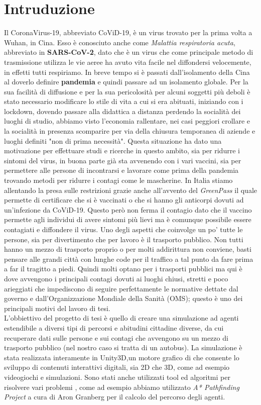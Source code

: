 \documentclass[12pt, openany]{book}
\begin{document}
	\chapter*{Intruduzione}	
		Il CoronaVirus-19, abbreviato CoViD-19, è un virus trovato per la prima volta a Wuhan, in Cina. Esso è conosciuto anche come \emph{Malattia respiratoria acuta}, abbreviato in \textbf{SARS-CoV-2}, dato che è un virus che come principale metodo di trasmissione utilizza le vie aeree ha avuto vita facile nel diffondersi velocemente, in effetti tutti respiriamo. In breve tempo si è passati dall'isolamento della Cina al doverlo definire \textbf{pandemia} e quindi passare ad un isolamento globale.
		Per la sua facilità di diffusione e per la sua pericolosità per alcuni soggetti più deboli è stato necessario modificare lo stile di vita a cui si era abituati, iniziando con i lockdown, dovendo passare alla didattica a distanza perdendo la socialità dei luoghi di studio, abbiamo visto l'economia rallentare, nei casi peggiori crollare e la socialità in presenza scomparire per via della chiusura temporanea di aziende e luoghi definiti "non di prima necessità".
		Questa situazione ha dato una motivazione per effettuare studi e ricerche in questo ambito, sia per ridurre i sintomi del virus, in buona parte già sta avvenendo con i vari vaccini, sia per permettere alle persone di incontrarsi e lavorare come prima della pandemia trovando metodi per ridurre i contagi come le mascherine. In Italia stiamo allentando la presa sulle restrizioni grazie anche all'avvento del \emph{GreenPass} il quale permette di certificare che si è vaccinati o che si hanno gli anticorpi dovuti ad un'infezione da CoViD-19. Questo però non ferma il contagio dato che il vaccino permette agli individui di avere sintomi più lievi ma è comunque possibile essere contagiati e diffondere il virus. 
		Uno degli aspetti che coinvolge un po' tutte le persone, sia per divertimento che per lavoro è il trasporto pubblico. Non tutti hanno un mezzo di trasporto proprio o per molti addirittura non conviene, basti pensare alle grandi città con lunghe code per il traffico a tal punto da fare prima a far il tragitto a piedi. Quindi molti optano per i trasporti pubblici ma qui è dove avvengono i principali contagi dovuti ai luoghi chiusi, stretti e poco arieggiati che impediscono di seguire perfettamente le normative dettate dal governo e dall'Organizzazione Mondiale della Sanità (OMS); questo è uno dei principali motivi del lavoro di tesi.\\
		L'obbiettivo del progetto di tesi è quello di creare una simulazione ad agenti estendibile a diversi tipi di percorsi e abitudini cittadine diverse, da cui recuperare dati sulle persone e sui contagi che avvengono su un mezzo di trasporto pubblico (nel nostro caso si tratta di un autobus). La simulazione è stata realizzata interamente in Unity3D,un motore grafico di che consente lo sviluppo di contenuti interattivi digitali, sia 2D che 3D, come ad esempio videogiochi e simulazioni. Sono stati anche utilizzati tool ed algoritmi per risolvere  vari problemi , come ad esempio abbiamo utilizzato \emph{A* Pathfinding Project} a cura di Aron Granberg per il calcolo del percorso degli agenti. 
\end{document}

